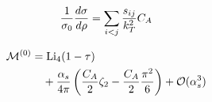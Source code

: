 \begin{equation}
  \frac{1}{\sigma_0} \frac{d\sigma}{d\rho} = \sum_{i<j} \frac{s_{ij}}{k_T^2} C_A
  \label{eq:4}
\end{equation}

\begin{align}
  \mathcal{M}^{(0)} &= \mathrm{Li}_{4}(1 - \tau) \nonumber \\
  &\quad + \frac{\alpha_s}{4\pi} \left( \frac{C_A}{2} \zeta_{2} - \frac{C_A}{2} \frac{\pi^2}{6} \right) + \mathcal{O}(\alpha_s^3) \label{eq:5}
\end{align}

